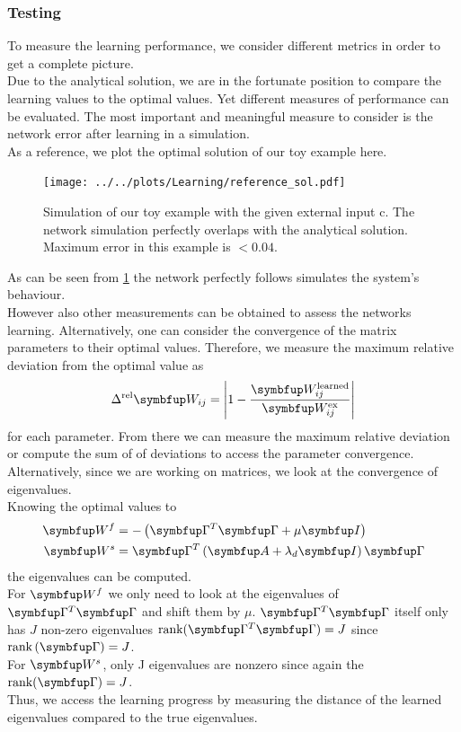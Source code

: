 \subsubsection{Testing}
To measure the learning performance, we consider different metrics in order to get a complete picture.\\
Due to the analytical solution, we are in the fortunate position to compare the learning values to the optimal values. Yet different measures of performance can be evaluated. The most important and meaningful measure to consider is the network error after learning in a simulation.\\
As a reference, we plot the optimal solution of our toy example here.
\begin{figure}
	\centering
	\texttt{[image: ../../plots/Learning/reference\_sol.pdf]}
	\caption{Simulation of our toy example with the given external input c. The network simulation perfectly overlaps with the analytical solution. Maximum error in this example is $<0.04$.}
	\label{fig:reference_sol}
\end{figure}
As can be seen from \cref{fig:reference_sol} the network perfectly follows simulates the system's behaviour.\\
However also other measurements can be obtained to assess the networks learning. Alternatively, one can consider the convergence of the matrix parameters to their optimal values. Therefore, we measure the maximum relative deviation from the optimal value as
\begin{equation}\label{eq:largest_rel_dev}
	\Delta^\text{rel} \bmu{W}_{ij} =\left|1 - \frac{\bmu{W}^{\text{learned}}_{ij}}{\bmu{W}^\text{ex}_{ij}}\right|
\end{equation}
for each parameter. From there we can measure the maximum relative deviation or compute the sum of of deviations to access the parameter convergence.\\
Alternatively, since we are working on matrices, we look at the convergence of eigenvalues.\\
Knowing the optimal values to
\begin{equation}
\begin{aligned}
	\bmu{W}^f &= -\left(\bmu{\Gamma}^T\bmu{\Gamma} + \mu \bmu{I}\right)\\
	\bmu{W}^s &= \bmu{\Gamma}^T\left(\bmu{A} + \lambda_d\bmu{I}\right)\bmu{\Gamma}\\
\end{aligned}
\end{equation}
the eigenvalues can be computed.\\
For $\bmu{W}^f$ we only need to look at the eigenvalues of $\bmu{\Gamma}^T\bmu{\Gamma}$ and shift them by $\mu$. $\bmu{\Gamma}^T\bmu{\Gamma}$ itself only has $J$ non-zero eigenvalues $\text{rank}(\bmu{\Gamma}^T\bmu{\Gamma}) = J$ since $\text{rank}\left(
\bmu{\Gamma}\right) = J$.\\
For $\bmu{W}^s$, only J eigenvalues are nonzero since again the $\text{rank}(\bmu{\Gamma}) = J$.\\
Thus, we access the learning progress by measuring the distance of the learned eigenvalues compared to the true eigenvalues.\\


